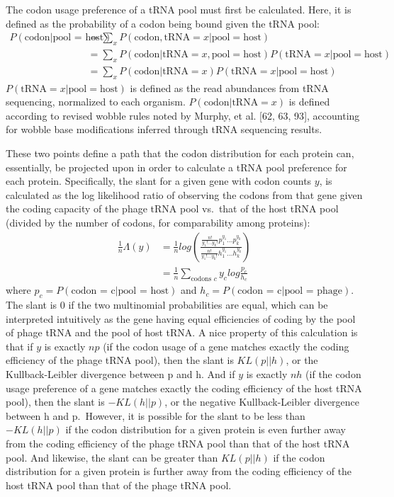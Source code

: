 \documentclass[12pt,twoside]{mitthesis-manusdown}
\begin{document}
The codon usage preference of a tRNA pool must first be calculated.
Here, it is defined as the probability of a codon being bound given the
tRNA pool:
\begin{align*}
  P(\text{codon} | \text{pool = host}) &= \sum_x P(\text{codon}, \text{tRNA} = x | \text{pool} = \text{host})\\
  &= \sum_x P(\text{codon} | \text{tRNA} = x, \text{pool} = \text{host}) P(\text{tRNA} = x | \text{pool} = \text{host}) \\
  &= \sum_x P(\text{codon} | \text{tRNA} = x) P(\text{tRNA} = x | \text{pool} = \text{host})
\end{align*}
\(P(\text{tRNA} = x | \text{pool} = \text{host})\) is defined as the
read abundances from tRNA sequencing, normalized to each organism.
\(P(\text{codon} | \text{tRNA} = x)\) is defined according to revised
wobble rules noted by Murphy, et al. {[}62, 63, 93{]}, accounting for
wobble base modifications inferred through tRNA sequencing results.

These two points define a path that the codon distribution for each
protein can, essentially, be projected upon in order to calculate a tRNA
pool preference for each protein. Specifically, the slant for a given
gene with codon counts \(y\), is calculated as the log likelihood ratio
of observing the codons from that gene given the coding capacity of the
phage tRNA pool vs.~that of the host tRNA pool (divided by the number of
codons, for comparability among proteins):
\begin{align*}
  \frac{1}{n}\Lambda(y) &= \frac{1}{n} log \left( \frac{\frac{n!}{y_1! ... y_k!}p_1^{y_1} ... p_k^{y_k}}{\frac{n!}{y_1! ... y_k!}h_1^{y_1} ... h_k^{y_k}} \right) \\
        &= \frac{1}{n} \sum_{\text{codons }c} y_c log \frac{p_c}{h_c}
\end{align*}
where \(p_c = P(\text{codon = c} | \text{pool = host})\) and
\(h_c = P(\text{codon = c} | \text{pool = phage})\). The slant is 0 if
the two multinomial probabilities are equal, which can be interpreted
intuitively as the gene having equal efficiencies of coding by the pool
of phage tRNA and the pool of host tRNA. A nice property of this
calculation is that if \(y\) is exactly \(np\) (if the codon usage of a
gene matches exactly the coding efficiency of the phage tRNA pool), then
the slant is \(KL (p || h)\), or the Kullback-Leibler divergence between
p and h. And if \(y\) is exactly \(nh\) (if the codon usage preference
of a gene matches exactly the coding efficiency of the host tRNA pool),
then the slant is \(-KL (h || p)\), or the negative Kullback-Leibler
divergence between h and p.~However, it is possible for the slant to be
less than \(-KL (h || p)\) if the codon distribution for a given protein
is even further away from the coding efficiency of the phage tRNA pool
than that of the host tRNA pool. And likewise, the slant can be greater
than \(KL (p || h)\) if the codon distribution for a given protein is
further away from the coding efficiency of the host tRNA pool than that
of the phage tRNA pool.
\end{document}
